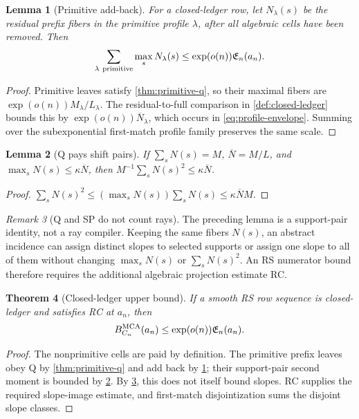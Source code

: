\documentclass[11pt,a4paper]{amsart}
\numberwithin{equation}{section}
\newtheorem{theorem}{Theorem}[section]
\newtheorem{lemma}[theorem]{Lemma}
\theoremstyle{remark}
\newtheorem{remark}[theorem]{Remark}
\newcommand{\barN}{\overline N}
\newcommand{\Eprof}{\mathfrak E}
\begin{document}
\begin{lemma}[Primitive add-back]\label{lem:addback}
For a closed-ledger row, let \(N_\lambda(s)\) be the residual prefix
fibers in the primitive profile \(\lambda\), after all algebraic cells have
been removed.  Then
\[
 \sum_{\lambda\ {\rm primitive}}\max_sN_\lambda(s)
 \le\exp(o(n))\Eprof_n(a_n).
\]
\end{lemma}

\begin{proof}
Primitive leaves satisfy \cref{thm:primitive-q}, so their maximal fibers are
\(\exp(o(n))M_\lambda/L_\lambda\).  The residual-to-full comparison in
\cref{def:closed-ledger} bounds this by
\(\exp(o(n))\barN_\lambda\), which occurs in
\eqref{eq:profile-envelope}.  Summing over the subexponential first-match
profile family preserves the same scale.
\end{proof}

\begin{lemma}[Q pays shift pairs]\label{lem:q-sp}
If \(\sum_sN(s)=M\), \(\barN=M/L\), and \(\max_sN(s)\le \kappa\barN\), then \(M^{-1}\sum_sN(s)^2\le\kappa\barN\).
\end{lemma}

\begin{proof}
\(\sum_sN(s)^2\le(\max_sN(s))\sum_sN(s)\le\kappa\barN M\).
\end{proof}

\begin{remark}[Q and SP do not count rays]\label{rem:q-sp-no-ray}
The preceding lemma is a support-pair identity, not a ray compiler.  Keeping
the same fibers \(N(s)\), an abstract incidence can assign distinct slopes
to selected supports or assign one slope to all of them without changing
\(\max_sN(s)\) or \(\sum_sN(s)^2\).  An RS numerator bound therefore
requires the additional algebraic projection estimate RC.
\end{remark}

\begin{theorem}[Closed-ledger upper bound]\label{thm:upper}
If a smooth RS row sequence is closed-ledger and satisfies RC at \(a_n\),
then
\[
        B_{C_n}^{\rm MCA}(a_n)
        \le \exp(o(n))\Eprof_n(a_n).
\]
\end{theorem}

\begin{proof}
The nonprimitive cells are paid by definition.  The primitive prefix leaves
obey Q by \cref{thm:primitive-q} and add back by \cref{lem:addback}; their
support-pair second moment is bounded by \cref{lem:q-sp}.  By
\cref{rem:q-sp-no-ray}, this does not itself bound slopes.  RC supplies the
required slope-image estimate, and first-match disjointization sums the
disjoint slope classes.
\end{proof}
\end{document}
